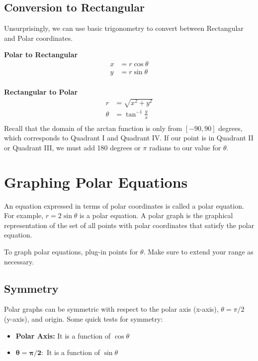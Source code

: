 \documentclass[11pt]{article}
\begin{document}
\subsection{Conversion to Rectangular}

Unsurprisingly, we can use basic trigonometry to convert between Rectangular and Polar coordinates.

\textbf{Polar to Rectangular}
\begin{align*}
    x &= r\cos\theta \\
    y &= r\sin\theta \\
\end{align*}

\textbf{Rectangular to Polar}
\begin{align*}
    r &= \sqrt{x^2 + y^2} \\
    \theta &= \tan^{-1}\frac{y}{x} \\
\end{align*}
Recall that the domain of the arctan function is only from $[-90, 90]$ degrees, which corresponds to Quadrant I and Quadrant IV. If our point is in Quadrant II or Quadrant III, we must add 180 degrees or $\pi$ radians to our value for $\theta$.

\section{Graphing Polar Equations}

An equation expressed in terms of polar coordinates is called a polar equation. For example, $r = 2\sin\theta$ is a polar equation. A polar graph is the graphical representation of the set of all points with polar coordinates that satisfy the polar equation.

To graph polar equations, plug-in points for $\theta$. Make sure to extend your range as necessary.

\subsection*{Symmetry}

Polar graphs can be symmetric with respect to the polar axis (x-axis), $\theta = \pi/2$ (y-axis), and origin. Some quick tests for symmetry:
\begin{itemize}
    \item \textbf{Polar Axis:} It is a function of $\cos\theta$
    \item $\mathbf{\theta = \pi/2:}$ It is a function of $\sin\theta$
\end{itemize}
\end{document}
